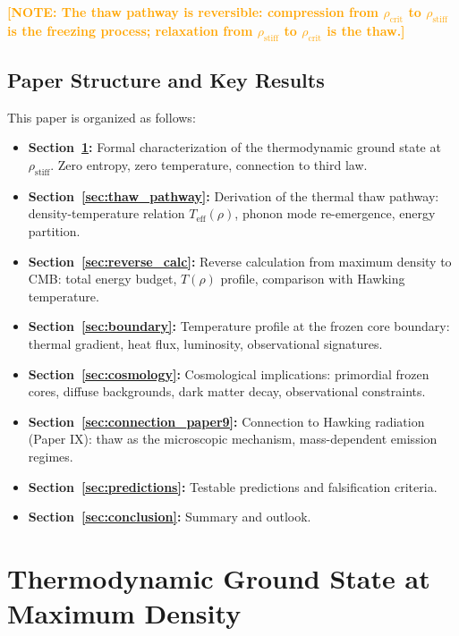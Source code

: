 \documentclass[11pt,a4paper]{article}
\newcommand{\rhocrit}{\ensuremath{\rho_{\mathrm{crit}}}}
\newcommand{\rhostiff}{\ensuremath{\rho_{\mathrm{stiff}}}}
\newcommand{\Teff}{\ensuremath{T_{\mathrm{eff}}}}
\newcommand{\NOTE}[1]{\textcolor{orange}{\textbf{[NOTE: #1]}}}
\theoremstyle{definition}
\theoremstyle{remark}
\begin{document}
\NOTE{The thaw pathway is reversible: compression from $\rhocrit$ to $\rhostiff$ is the freezing process; relaxation from $\rhostiff$ to $\rhocrit$ is the thaw.}

\subsection{Paper Structure and Key Results}
\label{sec:structure}

This paper is organized as follows:

\begin{itemize}[leftmargin=*, itemsep=0.3em]
\item \textbf{Section~\ref{sec:ground_state}:} Formal characterization of the thermodynamic ground state at $\rhostiff$. Zero entropy, zero temperature, connection to third law.
\item \textbf{Section~\ref{sec:thaw_pathway}:} Derivation of the thermal thaw pathway: density-temperature relation $\Teff(\rho)$, phonon mode re-emergence, energy partition.
\item \textbf{Section~\ref{sec:reverse_calc}:} Reverse calculation from maximum density to CMB: total energy budget, $T(\rho)$ profile, comparison with Hawking temperature.
\item \textbf{Section~\ref{sec:boundary}:} Temperature profile at the frozen core boundary: thermal gradient, heat flux, luminosity, observational signatures.
\item \textbf{Section~\ref{sec:cosmology}:} Cosmological implications: primordial frozen cores, diffuse backgrounds, dark matter decay, observational constraints.
\item \textbf{Section~\ref{sec:connection_paper9}:} Connection to Hawking radiation (Paper IX): thaw as the microscopic mechanism, mass-dependent emission regimes.
\item \textbf{Section~\ref{sec:predictions}:} Testable predictions and falsification criteria.
\item \textbf{Section~\ref{sec:conclusion}:} Summary and outlook.
\end{itemize}

\section{Thermodynamic Ground State at Maximum Density}
\label{sec:ground_state}
\end{document}
